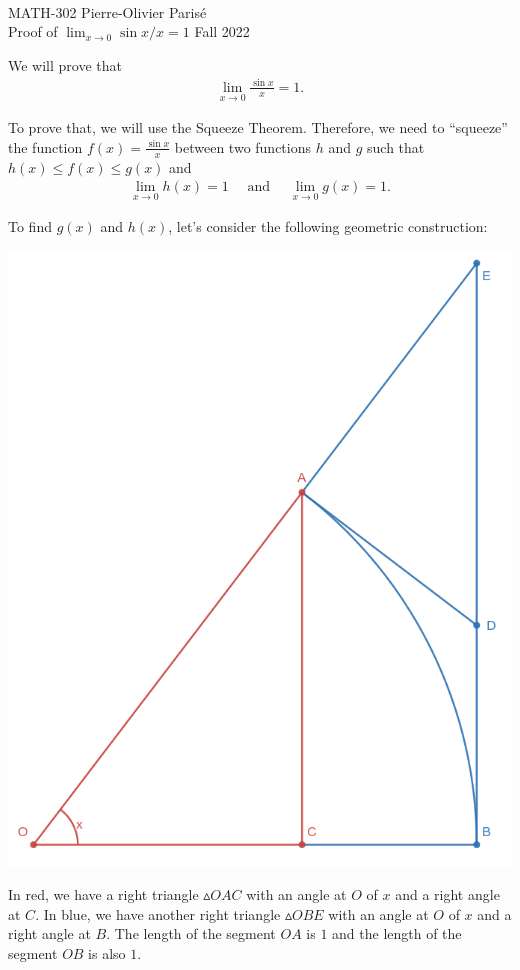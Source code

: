\documentclass[12pt]{article}
\newcommand{\ra}{\rightarrow}
\newcommand{\spc}{\vspace*{0.5cm}}
\begin{document}
	\noindent \hrulefill \\
	MATH-302 \hfill Pierre-Olivier Paris{\'e}\\
	Proof of $\lim_{x \ra 0} \sin x / x = 1$ \hfill Fall 2022\\\vspace*{-0.7cm}
	
	\noindent\hrulefill
	
	\spc
	
	We will prove that
		\begin{align*}
		\lim_{x \ra 0} \frac{\sin x}{x} = 1 .
		\end{align*}
		
	To prove that, we will use the Squeeze Theorem. Therefore, we need to ``squeeze'' the function $f(x) = \frac{\sin x}{x}$ between two functions $h$ and $g$ such that $h(x) \leq f(x) \leq g(x)$ and
		\begin{align*}
		\lim_{x \ra 0} h(x) = 1 \quad \text{ and } \quad \lim_{x \ra 0} g(x) = 1 .
		\end{align*}
	
	To find $g(x)$ and $h(x)$, let's consider the following geometric construction:
		\begin{center}
		\centering
		\includegraphics[scale=0.25]{Screenshot-from-2022-08-24 22-31-46.png}
		\end{center}
	In red, we have a right triangle $\vartriangle OAC$ with an angle at $O$ of $x$ and a right angle at $C$. In blue, we have another right triangle $\vartriangle OBE$ with an angle at $O$ of $x$ and a right angle at $B$. The length of the segment $OA$ is $1$ and the length of the segment $OB$ is also $1$. 
	
\end{document}

